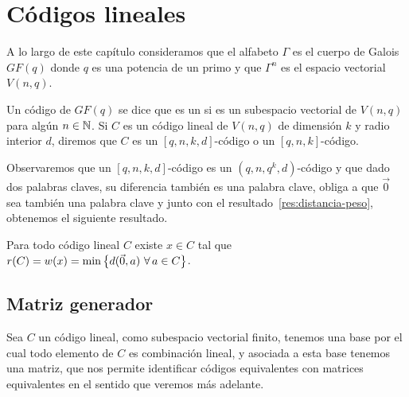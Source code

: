 \section{Códigos lineales}
A lo largo de este capítulo consideramos que el alfabeto $\Gamma$ es el cuerpo de Galois $GF(q)$ donde $q$ es una potencia de un primo y que $\Gamma^n$ es el espacio vectorial $V(n, q)$.
\begin{definition}
	Un código de $GF(q)$ se dice que es un  si es un subespacio vectorial de $V(n, q)$ para algún $n\in\mathbb{N}$.
	Si $C$ es un código lineal de $V(n, q)$ de dimensión $k$ y radio interior $d$, diremos que $C$ es un $[q, n, k, d]$-código o un $[q, n, k]$-código.
\end{definition}
Observaremos que un $[q, n, k, d]$-código es un $(q, n, q^k, d)$-código y que dado dos palabras claves, su diferencia también es una palabra clave, obliga a que $\vec{0}$ sea también una palabra clave y junto con el resultado~\ref{res:distancia-peso}, obtenemos el siguiente resultado.
\begin{lemma}
	\label{res:distancia-peso-lineal}
	Para todo código lineal $C$ existe $x\in C$ tal que $r(C)=w(x)=\min\set{d(\vec{0}, a)\ \forall a\in C}$.
\end{lemma}

\subsection{Matriz generador}
Sea $C$ un código lineal, como subespacio vectorial finito, tenemos una base por el cual todo elemento de $C$ es combinación lineal, y asociada a esta base tenemos una matriz, que nos permite identificar códigos equivalentes con matrices equivalentes en el sentido que veremos más adelante.

